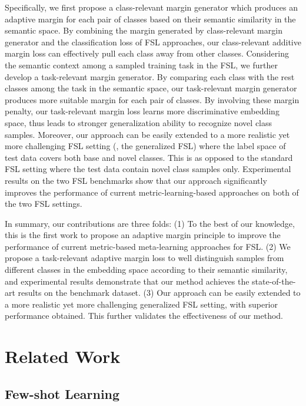 \documentclass[10pt,twocolumn,letterpaper]{article}
\begin{document}
Specifically, we first propose a class-relevant margin generator which produces an adaptive margin for each pair of classes based on their semantic similarity in the semantic space. By combining the margin generated by class-relevant margin generator and the classification loss of FSL approaches, our class-relevant additive margin loss can effectively pull each class away from other classes. Considering the semantic context among a sampled training task in the FSL, we further develop a task-relevant margin generator. By comparing each class with the rest classes among the task in the semantic space, our task-relevant margin generator produces more suitable margin for each pair of classes. By involving these margin penalty, our task-relevant margin loss learns more discriminative embedding space, thus leads to stronger generalization ability to recognize novel class samples.
Moreover, our approach can be easily extended to a more realistic yet more challenging FSL setting (\ie, the generalized FSL) where the label space of test data covers both base and novel classes. This is as opposed to the standard FSL setting where the test data contain novel class samples only. Experimental results on the two FSL benchmarks show that our approach significantly improves the performance of current metric-learning-based approaches on both of the two FSL settings.

In summary, our contributions are three folds: (1) To the best of our knowledge, this is the first work to propose an adaptive margin principle to improve the performance of current metric-based meta-learning approaches for FSL. (2) We propose a task-relevant adaptive margin loss to well distinguish samples from different classes in the embedding space according to their semantic similarity, and experimental results demonstrate that our method achieves the state-of-the-art results on the benchmark dataset. (3) Our approach can be easily extended to a more realistic yet more challenging generalized FSL setting, with superior performance obtained. This further validates the effectiveness of our method.

\section{Related Work}

\subsection{Few-shot Learning}
\end{document}
